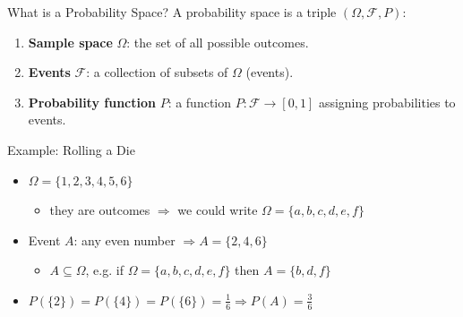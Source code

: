 \documentclass{beamer}
\begin{document}
\begin{frame}{What is a Probability Space?}
  A probability space is a triple $(\Omega, \mathcal{F}, P)$:
  \vspace{0.5cm}
\begin{enumerate}
  \item \textbf{Sample space} $\Omega$: the set of all possible outcomes.
  \item \textbf{Events} $\mathcal{F}$: a collection of subsets of $\Omega$ (events).
  \item \textbf{Probability function} $P$: a function $P: \mathcal{F} \rightarrow [0,1]$ assigning probabilities to events.
\end{enumerate}

\vspace{0.5cm}
\begin{block}{Example: Rolling a Die}
\begin{itemize}
  \item $\Omega = \{1, 2, 3, 4, 5, 6\}$
    \begin{itemize}
      \item they are outcomes $\Rightarrow$ we could write $\Omega = \{a, b, c, d, e, f\}$
    \end{itemize}
  \item Event $A$: any even number $\Rightarrow A = \{2, 4, 6\}$
    \begin{itemize}
      \item $A \subseteq \Omega$, e.g. if $\Omega = \{a, b, c, d, e, f\}$ then $A = \{b, d, f\}$
    \end{itemize}
  \item $P(\{2\}) = P(\{4\}) = P(\{6\}) = \frac{1}{6} \Rightarrow P(A) = \frac{3}{6}$
\end{itemize}
\end{block}
\end{frame}
\end{document}
